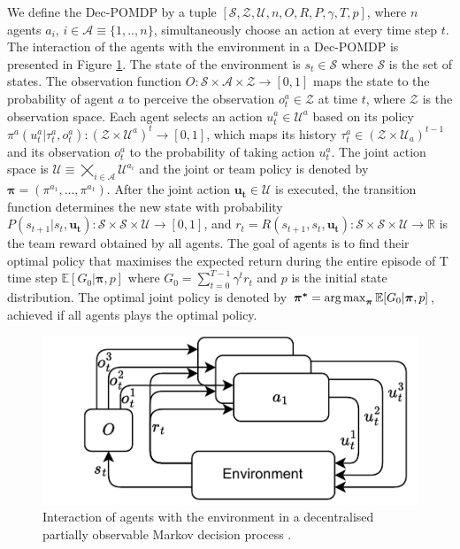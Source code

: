 We define the Dec-POMDP by a tuple $[\mathcal{S}, \mathcal{Z}, \mathcal{U}, n, O, R, P, \gamma, T, p]$, where $n$ agents $a_i$, $i \in \mathcal{A} \equiv \{1,..,n\}$, simultaneously choose an action at every time step $t$.
The interaction of the agents with the environment in a Dec-POMDP is presented in Figure \ref{fig:ch3_decpomdp}.
The state of the environment is $s_t \in \mathcal{S}$ where $\mathcal{S}$ is the set of states.
The observation function $O:\mathcal{S} \times \mathcal{A} \times  \mathcal{Z}\rightarrow [0,1]$ maps the state to the probability of agent $a$ to perceive the observation $o_t^{a} \in \mathcal{Z}$ at time $t$, where $\mathcal{Z}$ is the observation space.
Each agent selects an action $u_t^{a} \in \mathcal{U}^{a}$ based on its policy $\pi^{a}(u_t^{a}|\tau_t^{a},o_t^{a}): (\mathcal{Z} \times \mathcal{U}^a)^t \rightarrow [0,1]$, which maps its history $\tau_t^{a} \in (\mathcal{Z} \times \mathcal{U}_a)^{t-1}$ and its observation $o_t^{a}$ to the probability of taking action $u_t^{a}$. 
The joint action space is $\mathcal{U} \equiv \bigtimes_{i \in \mathcal{A}} \mathcal{U}^{a_i}$ and the joint or team policy is denoted by $\mathbf{\pi}=(\pi^{a_1},...,\pi^{a_1})$.
After the joint action $\mathbf{u_t} \in \mathcal{U}$ is executed, the transition function determines the new state with probability $P(s_{t+1}|s_t, \mathbf{u_t}): \mathcal{S} \times \mathcal{S} \times\mathcal{U} \rightarrow  [0,1] $, and $r_t=R(s_{t+1}, s_t, \mathbf {u_t}): \mathcal{S} \times \mathcal{S} \times \mathcal{U} \rightarrow \mathbb{R}$ is the team reward obtained by all agents.
The goal of agents is to find their optimal policy that maximises the expected return during the entire episode of T time step $\mathbb{E}[G_0|\mathbf{\pi}, p]$ where $G_0=\sum_{t=0}^{T-1} \gamma^{t} r_{t}$ and $p$ is the initial state distribution.
The optimal joint policy is denoted by $\mathbf{\pi^{*}} =\argmax_{\mathbf{\pi}} \mathbb{E}[G_0|\mathbf{\pi}, p]$, achieved if all agents plays the optimal policy.

\begin{figure}
    \centering
    \includegraphics[width=0.8\linewidth]{tex_thesis/figures/ch3/DECPOMDP.pdf}
    \caption{Interaction of agents with the environment in a decentralised partially observable Markov decision process \citep{DecPomdp}. }
    \label{fig:ch3_decpomdp}
\end{figure}

